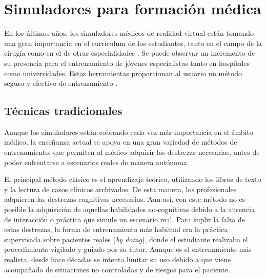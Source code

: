 \section{Simuladores para formación médica}
\label{art:medicalsim}

En los últimos años, los simuladores médicos de realidad virtual están tomando una gran importancia en el currículum de los estudiantes, tanto en el campo de la cirugía como en el de otras especialidades \cite{PATEL2017266.e7}. Se puede observar un incremento de su presencia para el entrenamiento de jóvenes especialistas tanto en hospitales como universidades. Estas herramientas proporcionan al usuario un método seguro y efectivo de entrenamiento \cite{simsafety}.

\subsection{Técnicas tradicionales}

Aunque los simuladores están cobrando cada vez más importancia en el ámbito médico, la enseñanza actual se apoya en una gran variedad de métodos de entrenamiento, que permiten al médico adquirir las destrezas necesarias, antes de poder enfrentarse a escenarios reales de manera autónoma. 


El principal método clásico es el aprendizaje teórico, utilizando los libros de texto y la lectura de casos clínicos archivados. 
De esta manera, los profesionales adquieren las destrezas cognitivas necesarias. Aun así, con este método no es posible la adquisición de aquellas habilidades no-cognitivas debido a la ausencia de interacción o práctica que simule un escenario real. 
Para suplir la falta de estas destrezas, la forma de entrenamiento más habitual era la práctica supervisada sobre pacientes reales (\emph{by doing}), donde el estudiante realizaba el procedimiento vigilado y guiado por su tutor. Aunque es el entrenamiento más realista, desde hace décadas se intenta limitar su uso debido a que viene acompañado de situaciones no controladas y de riesgos para el paciente. %

